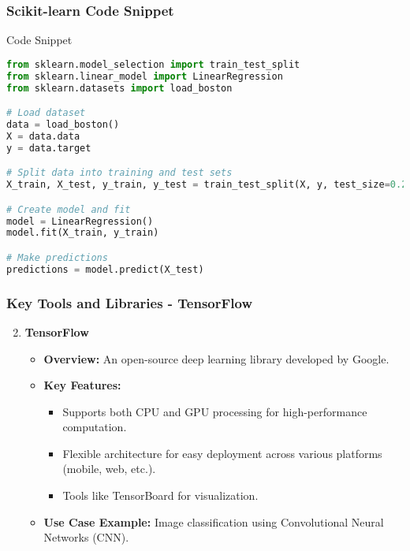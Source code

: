 \documentclass{beamer}
\begin{document}
\begin{frame}[fragile]
    \frametitle{Scikit-learn Code Snippet}
    \begin{block}{Code Snippet}
        \begin{lstlisting}[language=Python]
from sklearn.model_selection import train_test_split
from sklearn.linear_model import LinearRegression
from sklearn.datasets import load_boston

# Load dataset
data = load_boston()
X = data.data
y = data.target

# Split data into training and test sets
X_train, X_test, y_train, y_test = train_test_split(X, y, test_size=0.2, random_state=42)

# Create model and fit
model = LinearRegression()
model.fit(X_train, y_train)

# Make predictions
predictions = model.predict(X_test)
        \end{lstlisting}
    \end{block}
\end{frame}

\begin{frame}
    \frametitle{Key Tools and Libraries - TensorFlow}
    \begin{enumerate}
        \setcounter{enumi}{1} %
        \item \textbf{TensorFlow}
        \begin{itemize}
            \item \textbf{Overview:} An open-source deep learning library developed by Google.
            \item \textbf{Key Features:}
            \begin{itemize}
                \item Supports both CPU and GPU processing for high-performance computation.
                \item Flexible architecture for easy deployment across various platforms (mobile, web, etc.).
                \item Tools like TensorBoard for visualization.
            \end{itemize}
            \item \textbf{Use Case Example:} Image classification using Convolutional Neural Networks (CNN).
        \end{itemize}
    \end{enumerate}
\end{frame}
\end{document}
